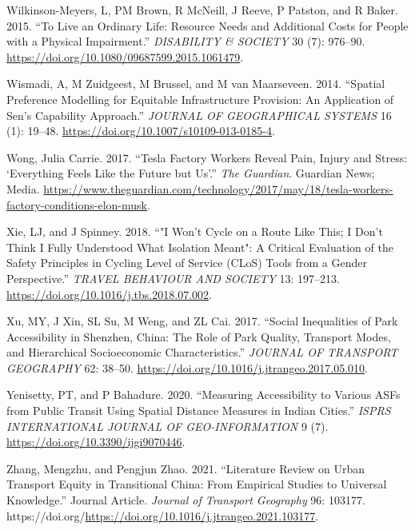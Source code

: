 \documentclass[12pt, oneside]{report}
\newlength{\cslhangindent}
\newlength{\cslentryspacingunit} %
\newenvironment{CSLReferences}[2] %
 {%
  \setlength{\parindent}{0pt}
  \ifodd #1
  \let\oldpar\par
  \def\par{\hangindent=\cslhangindent\oldpar}
  \fi
  \setlength{\parskip}{#2\cslentryspacingunit}
 }%
 {}
\begin{document}
\begin{CSLReferences}{1}{0}
\leavevmode{}%
Wilkinson-Meyers, L, PM Brown, R McNeill, J Reeve, P Patston, and R
Baker. 2015. {``To Live an Ordinary Life: Resource Needs and Additional
Costs for People with a Physical Impairment.''} \emph{DISABILITY \&
SOCIETY} 30 (7): 976--90.
\url{https://doi.org/10.1080/09687599.2015.1061479}.

\leavevmode{}%
Wismadi, A, M Zuidgeest, M Brussel, and M van Maarseveen. 2014.
{``Spatial {Preference Modelling} for Equitable Infrastructure
Provision: An Application of {Sen}'s {Capability Approach}.''}
\emph{JOURNAL OF GEOGRAPHICAL SYSTEMS} 16 (1): 19--48.
\url{https://doi.org/10.1007/s10109-013-0185-4}.

\leavevmode{}%
Wong, Julia Carrie. 2017. {``Tesla Factory Workers Reveal Pain, Injury
and Stress: {`Everything Feels Like the Future but Us'}.''} \emph{The
Guardian}. Guardian News; Media.
\url{https://www.theguardian.com/technology/2017/may/18/tesla-workers-factory-conditions-elon-musk}.

\leavevmode{}%
Xie, LJ, and J Spinney. 2018. {``"{I} Won't Cycle on a Route Like This;
{I} Don't Think {I} Fully Understood What Isolation Meant": {A} Critical
Evaluation of the Safety Principles in {Cycling Level} of {Service}
({CLoS}) Tools from a Gender Perspective.''} \emph{TRAVEL BEHAVIOUR AND
SOCIETY} 13: 197--213. \url{https://doi.org/10.1016/j.tbs.2018.07.002}.

\leavevmode{}%
Xu, MY, J Xin, SL Su, M Weng, and ZL Cai. 2017. {``Social Inequalities
of Park Accessibility in {Shenzhen}, {China}: {The} Role of Park
Quality, Transport Modes, and Hierarchical Socioeconomic
Characteristics.''} \emph{JOURNAL OF TRANSPORT GEOGRAPHY} 62: 38--50.
\url{https://doi.org/10.1016/j.jtrangeo.2017.05.010}.

\leavevmode{}%
Yenisetty, PT, and P Bahadure. 2020. {``Measuring {Accessibility} to
{Various ASFs} from {Public Transit} Using {Spatial Distance Measures}
in {Indian Cities}.''} \emph{ISPRS INTERNATIONAL JOURNAL OF
GEO-INFORMATION} 9 (7). \url{https://doi.org/10.3390/ijgi9070446}.

\leavevmode{}%
Zhang, Mengzhu, and Pengjun Zhao. 2021. {``Literature Review on Urban
Transport Equity in Transitional China: From Empirical Studies to
Universal Knowledge.''} Journal Article. \emph{Journal of Transport
Geography} 96: 103177.
https://doi.org/\url{https://doi.org/10.1016/j.jtrangeo.2021.103177}.


\end{CSLReferences}
\end{document}
